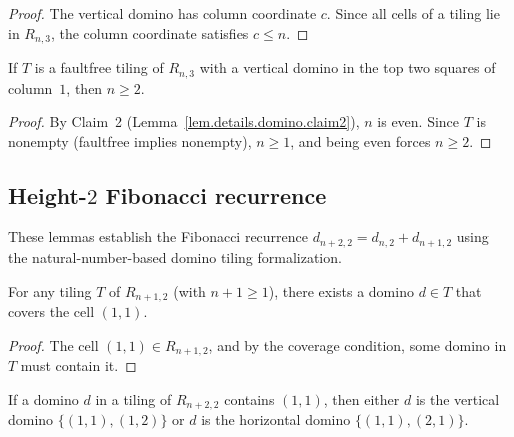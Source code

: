 \begin{proof}
\leanok
The vertical domino has column coordinate $c$. Since all cells of a
tiling lie in $R_{n,3}$, the column coordinate satisfies $c \le n$.
\end{proof}

\begin{lemma}
\label{lem.details.domino.faultfree-hasTopVertical-implies-n-ge-two}
\leanhelper
\leanok
If $T$ is a faultfree tiling of $R_{n,3}$ with a vertical domino in the
top two squares of column~$1$, then $n \ge 2$.
\end{lemma}

\begin{proof}
\leanok
By Claim~2 (Lemma~\ref{lem.details.domino.claim2}), $n$ is even.
Since $T$ is nonempty (faultfree implies nonempty), $n \ge 1$,
and being even forces $n \ge 2$.
\end{proof}

\subsection{Height-$2$ Fibonacci recurrence}

These lemmas establish the Fibonacci recurrence $d_{n+2,2} = d_{n,2} + d_{n+1,2}$
using the natural-number-based domino tiling formalization.

\begin{lemma}
\label{lem.details.domino.exists-domino-covering-11}
\leanhelper
\leanok
For any tiling $T$ of $R_{n+1,2}$ (with $n + 1 \ge 1$), there exists a domino
$d \in T$ that covers the cell $(1,1)$.
\end{lemma}

\begin{proof}
The cell $(1,1) \in R_{n+1,2}$, and by the coverage condition, some
domino in $T$ must contain it.
\end{proof}

\begin{lemma}
\label{lem.details.domino.domino-covering-11-cells}
\leanhelper
\leanok
If a domino $d$ in a tiling of $R_{n+2,2}$ contains $(1,1)$, then either
$d$ is the vertical domino $\{(1,1),(1,2)\}$ or
$d$ is the horizontal domino $\{(1,1),(2,1)\}$.
\end{lemma}

